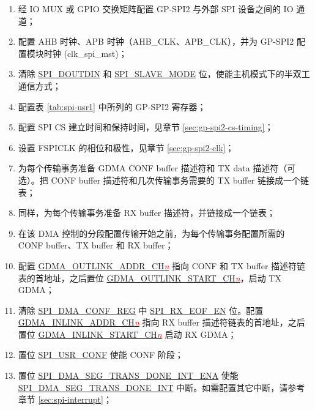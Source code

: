 \documentclass[main\_\_CN.tex]{subfiles}
\begin{document}
 \begin{enumerate}
    \item 经 IO MUX 或 GPIO 交换矩阵配置 GP-SPI2 与外部 SPI 设备之间的 IO 通道；
    \item 配置 AHB 时钟、APB 时钟（AHB\_CLK、APB\_CLK），并为 GP-SPI2 配置模块时钟 (clk\_spi\_mst)；

    \item 清除 \hyperref[fielddesc:SPIDOUTDIN]{SPI\_DOUTDIN} 和 \hyperref[fielddesc:SPISLAVEMODE]{SPI\_SLAVE\_MODE} 位，使能主机模式下的半双工通信方式；

    \item 配置表 \ref{tab:spi-usr1} 中所列的 GP-SPI2 寄存器；

    \item 配置 SPI CS 建立时间和保持时间，见章节  \ref{sec:gp-spi2-cs-timing}；

    \item 设置 FSPICLK 的相位和极性，见章节  \ref{sec:gp-spi2-clk}； 

   \item 为每个传输事务准备 GDMA CONF buffer 描述符和 TX data 描述符（可选）。把 CONF buffer 描述符和几次传输事务需要的 TX buffer 链接成一个链表；

   \item 同样，为每个传输事务准备 RX buffer 描述符，并链接成一个链表；
   \item 在该 DMA 控制的分段配置传输开始之前，为每个传输事务配置所需的 CONF buffer、TX buffer 和 RX buffer；

   \item 配置 \hyperref[fielddesc:GDMAOUTLINKADDRCH0]{GDMA\_OUTLINK\_ADDR\_CH\textcolor{red}{\it{n}}}  指向 CONF 和 TX buffer 描述符链表的首地址，之后置位 \hyperref[fielddesc:GDMAOUTLINKSTARTCH0]{GDMA\_OUTLINK\_START\_CH\textcolor{red}{\it{n}}}，启动 TX GDMA；

   \item 清除 \hyperref[regdesc:SPIDMACONFREG]{SPI\_DMA\_CONF\_REG} 中 \hyperref[fielddesc:SPIRXEOFEN]{SPI\_RX\_EOF\_EN} 位。配置 \hyperref[fielddesc:GDMAINLINKADDRCH0]{GDMA\_INLINK\_ADDR\_CH\textcolor{red}{\it{n}}}  指向 RX buffer 描述符链表的首地址，之后置位 \hyperref[fielddesc:GDMAINLINKSTARTCH0]{GDMA\_INLINK\_START\_CH\textcolor{red}{\it{n}}}  启动 RX GDMA；

   \item 置位 \hyperref[fielddesc:SPIUSRCONF]{SPI\_USR\_CONF} 使能 CONF 阶段；
   \item 置位 \hyperref[fielddesc:SPIDMASEGTRANSDONEINTENA]{SPI\_DMA\_SEG\_TRANS\_DONE\_INT\_ENA} 使能 \hyperref[int:SPIDMASEGTRANSDONEINT]{SPI\_DMA\_SEG\_TRANS\_DONE\_INT} 中断。如需配置其它中断，请参考章节  \ref{sec:spi-interrupt}；


\end{enumerate}
\end{document}
